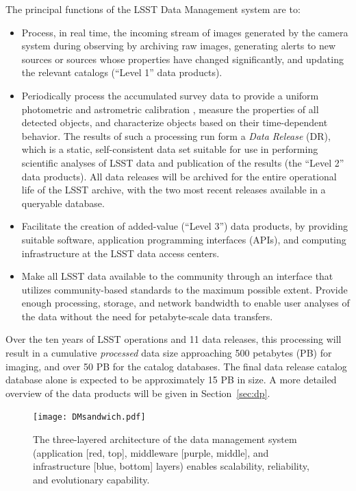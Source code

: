 \documentclass[11pt,twoside]{article}
\begin{document}
The principal functions of the LSST Data Management system \citep{lsstSRD} are to:
\begin{itemize}
\item Process, in real time, the incoming stream of images generated by the camera system during observing by archiving raw images, generating alerts to new sources or sources whose properties have changed significantly, and updating the relevant catalogs (``Level 1'' data products).
\item Periodically process the accumulated survey data to provide a
  uniform photometric and astrometric calibration \citep[e.g.,][]{LSE-180}, measure the
  properties of all detected objects, and characterize objects based on their time-dependent behavior. The results of such a processing run form a {\em Data Release} (DR), which is a static, self-consistent data set suitable for use in performing scientific analyses of LSST data and publication of the results (the ``Level 2'' data products). All data releases will be archived for the entire operational life of the LSST
archive, with the two most recent releases available in a
queryable database.
\item Facilitate the creation of added-value (``Level 3'') data products, by providing suitable software,
  application programming interfaces (APIs),
and computing infrastructure at the LSST data access centers.
\item Make all LSST data available to the community through an interface that utilizes
community-based standards   to the maximum possible extent. Provide
  enough processing, storage, and network bandwidth to enable user
  analyses of the data without the need for petabyte-scale data
  transfers.
\end{itemize}

Over the ten years of LSST operations and 11 data releases, this processing will result in a cumulative {\em processed} data size
approaching 500 petabytes (PB) for imaging, and over 50 PB for the
catalog databases. The final data release catalog database alone is expected
to be approximately 15 PB in size. A more detailed overview of the data products will be given in
Section~\ref{sec:dp}.
\\

\begin{figure}[!t]
%
%
\begin{center}
\texttt{[image: DMsandwich.pdf]}
\end{center}
\caption{The three-layered architecture of the data management system
(application [red, top], middleware [purple, middle], and infrastructure [blue, bottom] layers) enables scalability, reliability, and evolutionary capability.}
\label{Fig:DM1}
\end{figure}
\end{document}
